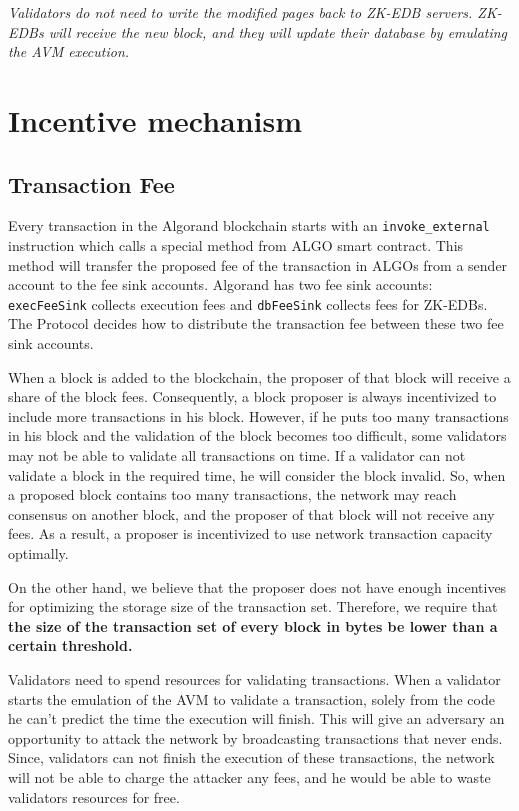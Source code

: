 \documentclass[11pt, A4]{report}
\begin{document}
    \emph{Validators do not need to write the modified pages back to ZK-EDB servers. ZK-EDBs will receive the new
    block, and they will update their database by emulating the AVM execution.}


    \section{Incentive mechanism}\label{sec:incentive-mechanism}

    \subsection{Transaction Fee}\label{subsec:transaction-fee}

    Every transaction in the Algorand blockchain starts with an \texttt{invoke\_external} instruction which calls a
    special method from ALGO smart contract. This method will transfer the proposed fee of the transaction in ALGOs
    from a sender account to the fee sink accounts. Algorand has two fee sink accounts: \texttt{execFeeSink} collects
    execution fees and \texttt{dbFeeSink} collects fees for ZK-EDBs. The Protocol decides how to distribute the
    transaction fee between these two fee sink accounts.

    When a block is added to the blockchain, the proposer of that block will receive a share of the block fees.
    Consequently, a block proposer is always incentivized to include more transactions in his block. However, if he
    puts too many transactions in his block and the validation of the block becomes too difficult, some validators
    may not be able to validate all transactions on time. If a validator can not validate a block in the required
    time, he will consider the block invalid. So, when a proposed block contains too many transactions, the network
    may reach consensus on another block, and the proposer of that block will not receive any fees. As a result, a
    proposer is incentivized to use network transaction capacity optimally.

    On the other hand, we believe that the proposer does not have enough incentives for optimizing the storage size
    of the transaction set. Therefore, we require that \textbf{the size of the transaction set of every block in
    bytes be lower than a certain threshold.}

    Validators need to spend resources for validating transactions. When a validator starts the emulation of the AVM
    to validate a transaction, solely from the code he can't predict the time the execution will finish. This will
    give an adversary an opportunity to attack the network by broadcasting transactions that never ends. Since,
    validators can not finish the execution of these transactions, the network will not be able to charge the
    attacker any fees, and he would be able to waste validators resources for free.
\end{document}
